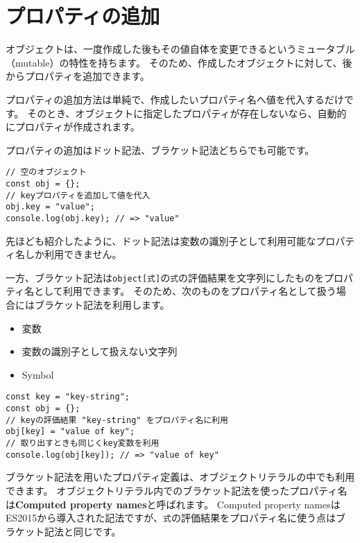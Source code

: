 \hypertarget{add-property}{%
\section{プロパティの追加}\label{add-property}}

オブジェクトは、一度作成した後もその値自体を変更できるというミュータブル（mutable）の特性を持ちます。
そのため、作成したオブジェクトに対して、後からプロパティを追加できます。

プロパティの追加方法は単純で、作成したいプロパティ名へ値を代入するだけです。
そのとき、オブジェクトに指定したプロパティが存在しないなら、自動的にプロパティが作成されます。

プロパティの追加はドット記法、ブラケット記法どちらでも可能です。

\begin{lstlisting}
// 空のオブジェクト
const obj = {};
// keyプロパティを追加して値を代入
obj.key = "value";
console.log(obj.key); // => "value"
\end{lstlisting}

先ほども紹介したように、ドット記法は変数の識別子として利用可能なプロパティ名しか利用できません。

一方、ブラケット記法は\texttt{object[式]}の\texttt{式}の評価結果を文字列にしたものをプロパティ名として利用できます。
そのため、次のものをプロパティ名として扱う場合にはブラケット記法を利用します。

\begin{itemize}
\item
  変数
\item
  変数の識別子として扱えない文字列
\item
  Symbol
\end{itemize}

\begin{lstlisting}
const key = "key-string";
const obj = {};
// keyの評価結果 "key-string" をプロパティ名に利用
obj[key] = "value of key";
// 取り出すときも同じくkey変数を利用
console.log(obj[key]); // => "value of key"
\end{lstlisting}

ブラケット記法を用いたプロパティ定義は、オブジェクトリテラルの中でも利用できます。
オブジェクトリテラル内でのブラケット記法を使ったプロパティ名は\textbf{Computed
property names}と呼ばれます。 Computed property
namesはES2015から導入された記法ですが、\texttt{式}の評価結果をプロパティ名に使う点はブラケット記法と同じです。

